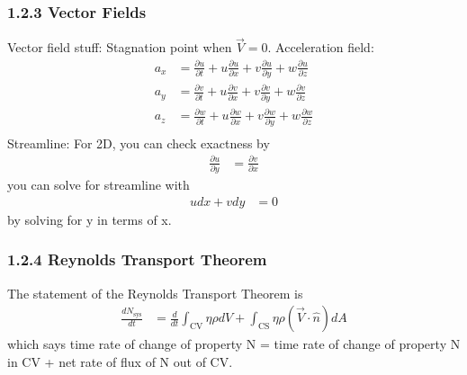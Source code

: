 \subsubsection{1.2.3 Vector Fields}
Vector field stuff: Stagnation point when $\vec{V} = 0$. Acceleration field:
\begin{align*}
    a_x &=  \frac{\partial u}{\partial t} + u \frac{\partial u}{\partial x} + v \frac{\partial u}{\partial y} + w \frac{\partial u}{\partial z} \\
    a_y &=  \frac{\partial v}{\partial t} + u \frac{\partial v}{\partial x} + v \frac{\partial v}{\partial y} + w \frac{\partial v}{\partial z} \\
    a_z &=  \frac{\partial w}{\partial t} + u \frac{\partial w}{\partial x} + v \frac{\partial w}{\partial y} + w \frac{\partial w}{\partial z} \\
\end{align*}
Streamline: For 2D, you can check exactness by 
\begin{align*}
    \frac{\partial u}{\partial y} &= \frac{\partial v}{\partial x}
\end{align*}
you can solve for streamline with 
\begin{align*}
    u dx + v dy &= 0 
\end{align*}
by solving for y in terms of x.
\subsubsection{1.2.4 Reynolds Transport Theorem}
The statement of the Reynolds Transport Theorem is
\begin{align*}
    \frac{dN_{\text{sys}}}{dt} &= \frac{d}{dt} \int_{\text{CV}} \eta \rho dV + \int_{\text{CS}} \eta \rho (\vec{V} \cdot \hat{n}) dA
\end{align*}
which says time rate of change of property N = time rate of change of property N in CV + net rate of flux of N out of CV.


